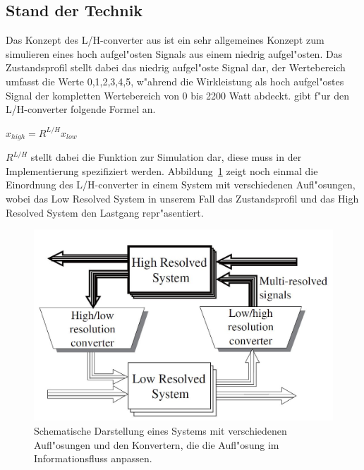 \subsection{Stand der Technik}
\label{Stand der Technik}
Das Konzept des L/H-converter aus \cite{hara2008multi} ist ein sehr allgemeines Konzept zum simulieren eines hoch aufgel"osten Signals aus einem niedrig aufgel"osten. Das Zustandsprofil stellt dabei das niedrig aufgel"oste Signal dar, der Wertebereich umfasst die Werte 0,1,2,3,4,5, w"ahrend die Wirkleistung als hoch aufgel"ostes Signal der kompletten Wertebereich von 0 bis 2200 Watt abdeckt. \cite{hara2008multi} gibt f"ur den L/H-converter folgende Formel an.\\
\begin{center}
$x_{high} = R^{L/H} x_{low}$
\end{center}
$R^{L/H}$ stellt dabei die Funktion zur Simulation dar, diese muss in der Implementierung spezifiziert werden.
Abbildung~\ref{converter} zeigt noch einmal die Einordnung des L/H-converter in einem System mit verschiedenen Aufl"osungen, wobei das Low Resolved System in unserem Fall das Zustandsprofil und das High Resolved System den Lastgang repr"asentiert. 
\begin{figure}[h]
\includegraphics[height=0.7\textwidth]{1_Grafiken/multiresolved.jpg}
	\caption[Multi Resolved System]{Schematische Darstellung eines Systems mit verschiedenen Aufl"osungen und den Konvertern, die die Aufl"osung im Informationsfluss anpassen.}
\label{converter}
\end{figure}

